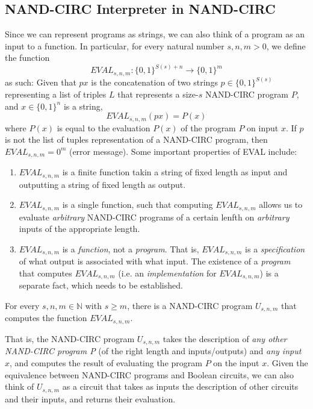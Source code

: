 \subsection{NAND-CIRC Interpreter in NAND-CIRC}

  Since we can represent programs as strings, we can also think of a program as an input to a function. In particular, for every natural number $s, n, m > 0$, we define the function
  \[EVAL_{s, n, m} : \{0,1\}^{S(s) + n} \longrightarrow \{0,1\}^m\]
  as such: Given that $px$ is the concatenation of two strings $p \in \{0,1\}^{S(s)}$ representing a list of triples $L$ that represents a size-$s$ NAND-CIRC program $P$, and $x \in \{0,1\}^n$ is a string, 
  \[EVAL_{s, n, m} (px) = P(x)\]
  where $P(x)$ is equal to the evaluation $P(x)$ of the program $P$ on input $x$. If $p$ is not the list of tuples representation of a NAND-CIRC program, then $EVAL_{s, n, m} = 0^m$ (error message). Some important properties of EVAL include: 
  \begin{enumerate}
      \item $EVAL_{s, n, m}$ is a finite function takin a string of fixed length as input and outputting a string of fixed length as output. 
      \item $EVAL_{s, n, m}$ is a single function, such that computing $EVAL_{s, n, m}$ allows us to evaluate \textit{arbitrary} NAND-CIRC programs of a certain lenfth on \textit{arbitrary} inputs of the appropriate length. 
      \item $EVAL_{s, n, m}$ is a \textit{function}, not a \textit{program}. That is, $EVAL_{s, n, m}$ is a \textit{specification} of what output is associated with what input. The existence of a \textit{program} that computes $EVAL_{s, n, m}$ (i.e. an \textit{implementation} for $EVAL_{s, n, m}$) is a separate fact, which needs to be established. 
  \end{enumerate}

  \begin{theorem}
  For every $s, n, m \in \mathbb{N}$ with $s \geq m$, there is a NAND-CIRC program $U_{s, n, m}$ that computes the function $EVAL_{s, n, m}$. 
  \end{theorem}

  That is, the NAND-CIRC program $U_{s, n, m}$ takes the description of \textit{any other NAND-CIRC program P} (of the right length and inputs/outputs) and \textit{any input $x$}, and computes the result of evaluating the program $P$ on the input $x$. Given the equivalence between NAND-CIRC programs and Boolean circuits, we can also think of $U_{s, n, m}$ as a circuit that takes as inputs the description of other circuits and their inputs, and returns their evaluation. 

